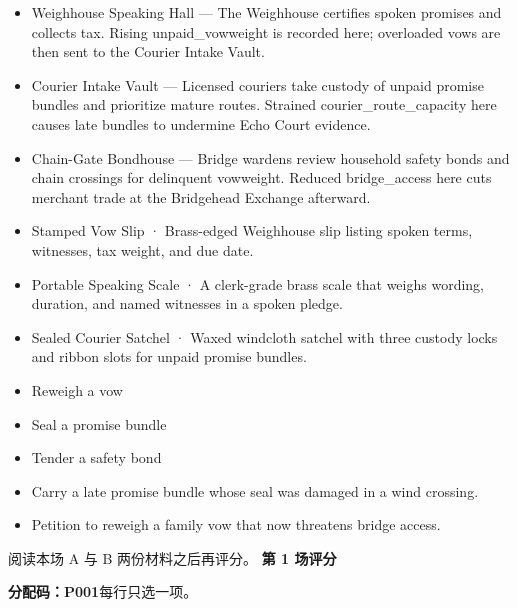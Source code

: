 \documentclass[10pt,a4paper]{article}
\newcommand{\heading}[1]{\par\vspace{5pt}{\color{teal}\bfseries #1}\par}
\begin{document}
\begin{minipage}[t]{0.48\linewidth}\fontsize{9}{12}\selectfont\raggedright\setlength{\parskip}{0pt}
\heading{地点与用途}\begin{itemize}
\item Weighhouse Speaking Hall — The Weighhouse certifies spoken promises and collects tax. Rising unpaid\_vowweight is recorded here; overloaded vows are then sent to the Courier Intake Vault.
\item Courier Intake Vault — Licensed couriers take custody of unpaid promise bundles and prioritize mature routes. Strained courier\_route\_capacity here causes late bundles to undermine Echo Court evidence.
\item Chain-Gate Bondhouse — Bridge wardens review household safety bonds and chain crossings for delinquent vowweight. Reduced bridge\_access here cuts merchant trade at the Bridgehead Exchange afterward.
\end{itemize}
\heading{物件}\begin{itemize}
\item Stamped Vow Slip · Brass-edged Weighhouse slip listing spoken terms, witnesses, tax weight, and due date.
\item Portable Speaking Scale · A clerk-grade brass scale that weighs wording, duration, and named witnesses in a spoken pledge.
\item Sealed Courier Satchel · Waxed windcloth satchel with three custody locks and ribbon slots for unpaid promise bundles.
\end{itemize}
\heading{可能采取的行动}\begin{itemize}
\item Reweigh a vow
\item Seal a promise bundle
\item Tender a safety bond
\end{itemize}
\heading{玩家进入方式}\begin{itemize}
\item Carry a late promise bundle whose seal was damaged in a wind crossing.
\item Petition to reweigh a family vow that now threatens bridge access.
\end{itemize}
\end{minipage}
\vfill\small 阅读本场 A 与 B 两份材料之后再评分。
\clearpage
{\Large\bfseries 第 1 场评分}\par
\textbf{分配码：P001}\quad 每行只选一项。\par\vspace{8pt}
\end{document}
